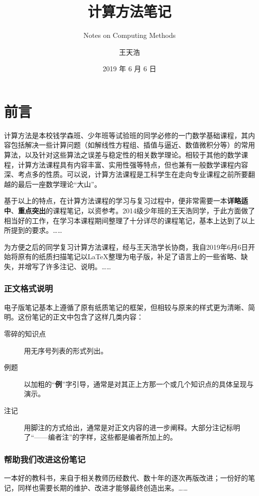 \documentclass[opensource,b5paper,sourcefont]{qyxf-book}
\title{计算方法笔记}
\subtitle{Notes on Computing Methods}
\author{王天浩}
\date{2019 年 6 月 6 日}
\begin{document}
\maketitle

\frontmatter
\chapter*{前言}
计算方法是本校钱学森班、少年班等试验班的同学必修的一门数学基础课程，其内容包括解决一些计算问题（如解线性方程组、插值与逼近、数值微积分等）的常用算法，以及针对这些算法之误差与稳定性的相关数学理论。相较于其他的数学课程，计算方法课程具有内容丰富、实用性强等特点，但也兼有一般数学课程内容深、考点多的性质。可以说，计算方法课程是工科学生在走向专业课程之前所要翻越的最后一座数学理论“大山”。

基于以上的特点，在计算方法课程的学习与复习过程中，便非常需要一本\textbf{详略适中}、\textbf{重点突出}的课程笔记，以资参考。2014级少年班的王天浩同学，于此方面做了相当好的工作，在学习本课程期间整理了十分详尽的课程笔记，基本上达到了以上所提到的要求。……

为方便之后的同学复习计算方法课程，经与王天浩学长协商，我自2019年6月6日开始将原有的纸质扫描笔记以\LaTeX 整理为电子版，补足了语言上的一些省略、缺失，并增写了许多注记、说明。……

\subsection*{正文格式说明}
电子版笔记基本上遵循了原有纸质笔记的框架，但相较与原来的样式更为清晰、简明。这份笔记的正文中包含了这样几类内容：
\begin{description}
    \item[零碎的知识点] 用无序号列表的形式列出。
    \item[例题] 以加粗的“\textbf{例}”字引导，通常是对其正上方那一个或几个知识点的具体呈现与演示。
    \item[注记] 用脚注的方式给出，通常是对正文内容的进一步阐释。大部分注记标明了“——编者注”的字样，这些都是编者所加上的。
\end{description}

\subsection*{帮助我们改进这份笔记}
一本好的教科书，来自于相关教师历经数代、数十年的逐次再版改进；一份好的笔记，同样也需要长期的维护、改进才能够最终创造出来。……
\end{document}
